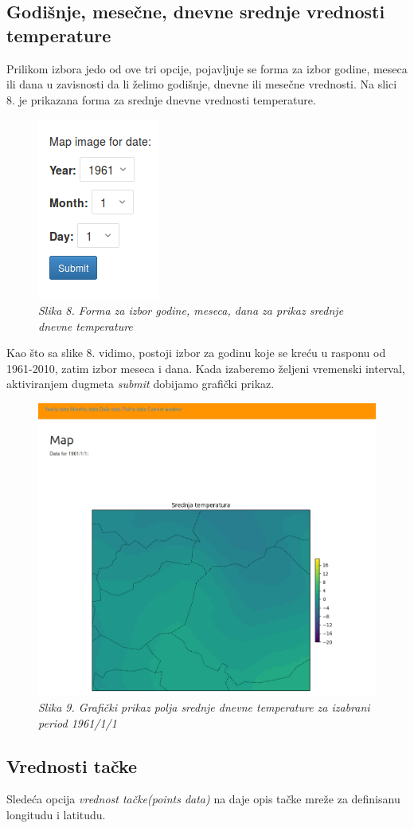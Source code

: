 \documentclass[12pt]{article}
\begin{document}
\subsection{Godišnje, mesečne, dnevne srednje vrednosti temperature}

Prilikom izbora jedo od ove tri opcije, pojavljuje se forma za izbor godine, meseca ili dana u zavisnosti da li želimo godišnje, dnevne ili mesečne vrednosti. Na slici 8. je prikazana forma za srednje dnevne vrednosti temperature.   



\begin{figure}[!htb]
\centering
\includegraphics[width=0.2\linewidth]{Daily.png}
\caption*{\textsl{Slika 8. Forma za izbor godine, meseca, dana za prikaz srednje dnevne temperature}}
\end{figure}

Kao što sa slike 8. vidimo, postoji izbor za godinu koje se kreću u rasponu od 1961-2010, zatim izbor meseca i dana. Kada izaberemo željeni vremenski interval, aktiviranjem dugmeta \textit{submit} dobijamo grafički prikaz. 

\begin{figure}[!htb]
	\centering
	\includegraphics[width=0.6\linewidth]{mapa.png}
	\caption*{\textsl{Slika 9. Grafički prikaz polja srednje dnevne temperature za izabrani period 1961/1/1}}
\end{figure}

\subsection{Vrednosti tačke}
Sledeća opcija \textit{vrednost tačke(points data)} na daje opis tačke mreže za definisanu longitudu i latitudu. 
\end{document}
